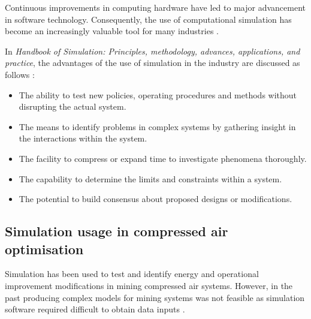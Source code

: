 		Continuous improvements in computing hardware have led to major advancement in software technology. Consequently, the use of computational simulation has become an increasingly valuable tool for many industries \cite{kocsis2003integration}.
		\par 
		In \textit{ Handbook of Simulation: Principles, methodology, advances, applications, and practice}, the advantages of the use of simulation in the industry are discussed as follows \cite{banks1998handbook}: %
		\begin{itemize}
			\item The ability to test new policies, operating procedures and methods without disrupting the actual system.
			\item The means to identify problems in complex systems by gathering insight in the interactions within the system.
			\item The facility to compress or expand time to investigate phenomena thoroughly.
			\item The capability to determine the limits and constraints within a system.
			\item The potential to build consensus about proposed designs or modifications.
		\end{itemize}

	\subsection{Simulation usage in compressed air optimisation}
		Simulation has been used to test and identify energy and operational improvement modifications in mining compressed air systems. However, in the past producing complex models for mining systems was not feasible as simulation software required difficult to obtain data inputs \cite{marais2013simplification}. 
		\par 
